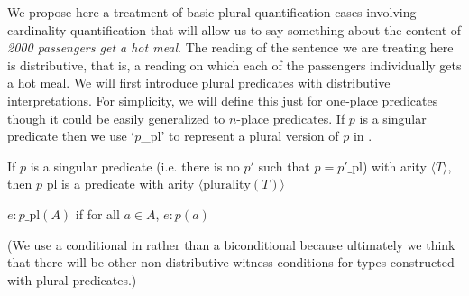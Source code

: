 We propose here a treatment of basic plural
quantification cases involving cardinality quantification that will
allow us to say something about the content of \textit{2000 passengers
  get a hot meal}.  The reading of the sentence we are treating here
is distributive, that is, a reading on which each of the passengers
individually gets a hot meal.  We will first introduce plural
predicates with distributive interpretations.  For simplicity, we will
define this just for one-place predicates though it could be easily
generalized to $n$-place predicates.  If $p$ is a singular predicate then we
use `$p$\_pl' to represent a plural version of $p$
in \nexteg{}.
\begin{ex} 
\begin{subex} 
 
\item If $p$ is a singular predicate (i.e. there is no $p'$ such that
  $p=p'\_\text{pl}$) with arity $\langle T\rangle$, then
  $p\_\text{pl}$ is a predicate with arity $\langle\mathrm{plurality}(T)\rangle$ 
 
\item $e:p\_\text{pl}(A)$ if for all $a\in A$, $e:p(a)$ 
 
\end{subex} 
   
\end{ex} 
(We use a conditional in  rather than a biconditional
because ultimately we think that there will be other non-distributive
witness conditions for types constructed with plural predicates.)

